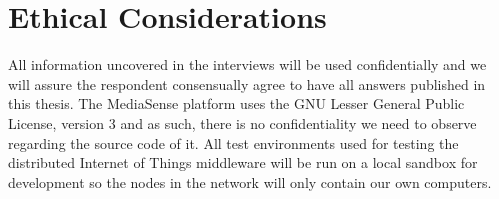 \section{Ethical Considerations}
All information uncovered in the interviews will be used confidentially and we will assure the respondent consensually agree to have all answers published in this thesis.
The MediaSense platform uses the GNU Lesser General Public License, version 3 \cite{gnu} and as such, there is no confidentiality we need to observe regarding the source code of it.
All test environments used for testing the distributed Internet of Things middleware will be run on a local sandbox for development so the nodes in the network will only contain our own computers. 